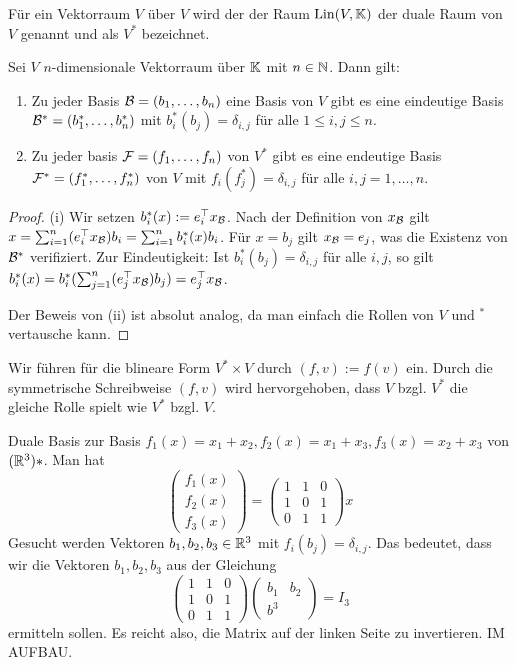 	Für ein Vektorraum $V$ über $V$ wird der der Raum $\operatorname{Lin}(V,\mathbb K)$ der duale Raum von $V$ genannt und als $V^\ast$ bezeichnet. 
	
	\begin{propn}
		Sei $V$ $n$-dimensionale Vektorraum über $\mathbb K$ mit $n \in \mathbb N$. Dann gilt: 
		\begin{enumerate} 
			\item Zu jeder Basis $\mathcal{B}=(b_1,\ldots,b_n)$ eine Basis von $V$ gibt es eine eindeutige Basis $\mathcal{B}^\ast= (b_1^\ast,\ldots, b_n^\ast)$ mit $b^\ast_i(b_j) = \delta_{i,j}$ für alle $1 \le i ,j \le n$. 
			\item Zu jeder basis $\mathcal{F}= (f_1,\ldots,f_n)$  von $V^\ast$ gibt es eine endeutige Basis $\mathcal{F}^\ast = (f_1^\ast,\ldots, f_n^\ast)$ von $V$ mit $f_i(f_j^\ast) = \delta_{i,j}$ für alle $i,j=1,\ldots,n$. 
		\end{enumerate} 
	\end{propn}
	\begin{proof} 
		(i) Wir setzen $b_i^\ast (x) := e_i^\top x_{\mathcal{B}}$. Nach der Definition von $x_{\mathcal{B}}$ gilt $x = \sum_{i=1}^n (e_i^\top x_{\mathcal{B}}) b_i = \sum_{i=1}^n b_i^\ast(x) b_i$. Für $x = b_j$ gilt $x_{\mathcal{B}}= e_j$, was die Existenz von $\mathcal{B}^\ast$ verifiziert. Zur Eindeutigkeit: Ist $b_i^\ast(b_j) = \delta_{i,j}$ für alle $i,j$, so gilt $b_i^\ast(x) = b_i^\ast( \sum_{j=1}^n (e_j^\top x_{\mathcal{B}}) b_j ) = e_j^\top x_{\mathcal{B}}$. 
		
		Der Beweis von (ii) ist absolut analog, da man einfach die Rollen von $V$ und $^\ast$ vertausche kann. 
	\end{proof} 
	
	Wir führen für die blineare Form $V^\ast \times V$ durch $(f,v) := f(v)$ ein. Durch die symmetrische Schreibweise $(f,v)$ wird hervorgehoben, dass $V$ bzgl. $V^\ast$ die gleiche Rolle spielt wie $V^\ast$ bzgl. $V$. 
	
	\begin{bsp}
		Duale Basis zur Basis $f_1(x) = x_1 + x_2, f_2(x) = x_1 + x_3, f_3(x) = x_2 + x_3$ von $(\mathbb R^3)\ast$. Man hat 
		\[
		\begin{pmatrix}
			f_1(x) \\ f_2(x) \\ f_3(x)  
		\end{pmatrix} 
		= 
		\begin{pmatrix}
			1 & 1& 0
			\\ 1 & 0 & 1 
			\\ 0 & 1 & 1 
		\end{pmatrix}
		x
		\]
		Gesucht werden Vektoren $b_1,b_2, b_3\in \mathbb R^3$ mit $f_i(b_j) = \delta_{i,j}$. Das bedeutet, dass wir die Vektoren $b_1,b_2,b_3$ aus der Gleichung 
		\[
		\begin{pmatrix}
			1 & 1& 0
			\\ 1 & 0 & 1 
			\\ 0 & 1 & 1 
		\end{pmatrix}		
		\begin{pmatrix} b_1 & b_2 \\ b^3
		\end{pmatrix} 
		= I_3
		\]
		ermitteln sollen. Es reicht also, die Matrix auf der linken Seite zu invertieren. IM AUFBAU. 
	\end{bsp} 
	
